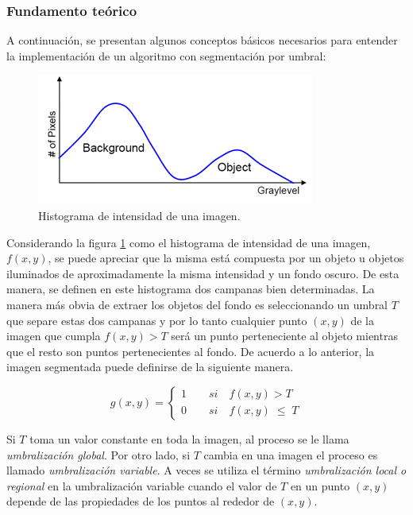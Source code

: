 \subsubsection{Fundamento teórico }
\label{fundamentoteoseg}

A continuación, se presentan algunos conceptos básicos necesarios para entender la implementación de un algoritmo con segmentación por umbral:

\begin{figure}[hbt]
\begin{center}
\includegraphics[scale=0.7]{img/otsu2.png}
\end{center}
\caption{Histograma de intensidad de una imagen\cite{histImgRef}.}
\label{otsuFruta}
\end{figure}

Considerando la figura \ref{otsuFruta} como el histograma de intensidad de una imagen, $f(x,y)$, se puede apreciar que la misma está compuesta por un objeto u objetos iluminados de aproximadamente la misma intensidad y un fondo oscuro. De esta manera, se definen en este histograma dos campanas bien determinadas. La manera más obvia de extraer los objetos del fondo es seleccionando un umbral $T$ que separe estas dos campanas y por lo tanto cualquier punto $(x,y)$ de la imagen que cumpla $f(x,y) > T$ será un punto perteneciente al objeto mientras que el resto son puntos pertenecientes al fondo. De acuerdo a lo anterior, la imagen segmentada puede definirse de la siguiente manera.

\begin{equation}
g(x,y) = \left\{
\begin{array}{l}
\displaystyle 1{\qquad}si{\quad}f(x,y) > T\\
\displaystyle 0{\qquad}si{\quad}f(x,y)\;{\leq}\;T
\end{array} 
\right.
\label{eq:xdef}
\end{equation}

Si $T$ toma un valor constante en toda la imagen, al proceso se le llama \textit{umbralización global}. Por otro lado, si $T$ cambia en una imagen el proceso es llamado \textit{umbralización variable}. A veces se utiliza el término \textit{umbralización local o regional} en la umbralización variable cuando el valor de $T$ en un punto $(x,y)$ depende de las propiedades de los puntos al rededor de $(x,y)$.

